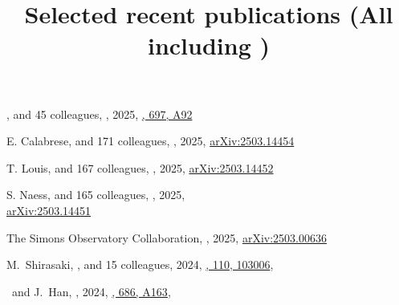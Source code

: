 \title{Selected recent publications {\small (All including \myself)}}


\noindent



\begin{etaremune}

\item
\myself, and 45 colleagues,
,
2025, \href{https://ui.adsabs.harvard.edu/abs/2025A&A...697A..92S}{\aap, 697, A92}

\item
E. Calabrese, and 171 colleagues,
,
2025, \href{https://ui.adsabs.harvard.edu/abs/2025arXiv250314454C}{arXiv:2503.14454}
\submitted{\jcap}

\item
T. Louis, and 167 colleagues,
,
2025, \href{https://ui.adsabs.harvard.edu/abs/2025arXiv250314452L}{arXiv:2503.14452}
\submitted{\jcap}

\item
S. Naess, and 165 colleagues,
,
2025, \\\href{https://ui.adsabs.harvard.edu/abs/2025arXiv250314451N}{arXiv:2503.14451}
\submitted{\jcap}

\item
The Simons Observatory Collaboration,
,
2025, \href{https://ui.adsabs.harvard.edu/abs/2025arXiv250300636A}{arXiv:2503.00636}
\submitted{\jcap}

\item
M.~Shirasaki, \myself, and 15 colleagues,
2024, \href{https://ui.adsabs.harvard.edu/abs/2024arXiv240708201S/abstract}{\prd, 110, 103006},

\item
\myself\ and J.~Han,
,
2024, \href{https://ui.adsabs.harvard.edu/abs/2024A&A...686A.163S/abstract}{\aap, 686, A163},
   

\end{etaremune}
